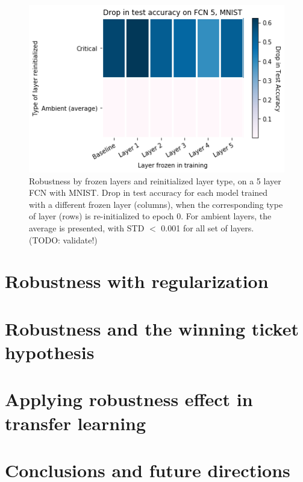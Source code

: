 \documentclass{article}
\begin{document}
\begin{figure}
  \includegraphics[width=\linewidth]{images/fc5_mnist_drop_in_acc_by_layer.png}
  \caption{Robustness by frozen layers and reinitialized layer type, on a 5 layer FCN with MNIST. Drop in test accuracy for each model trained with a different frozen layer (columns), when the corresponding type of layer (rows) is re-initialized to epoch 0. For ambient layers, the average is presented, with STD $<$ 0.001 for all set of layers. (TODO: validate!)}
  \label{fig:fc5_drop_by_layer_type}
\end{figure}
\section{Robustness with regularization}
\section{Robustness and the winning ticket hypothesis}
    
\section{Applying robustness effect in transfer learning}

\section{Conclusions and future directions}


\end{document}
